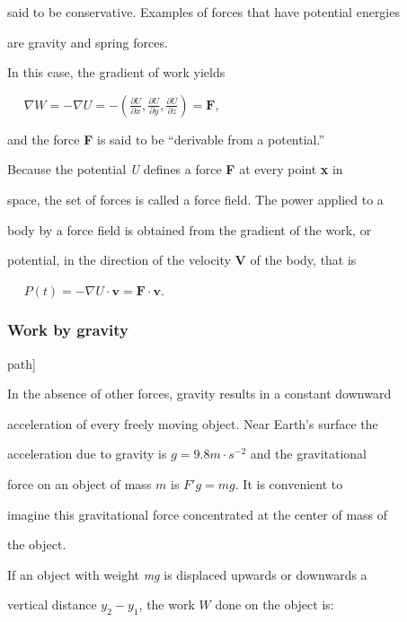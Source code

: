 said to be conservative. Examples of forces that have potential energies

are gravity and spring forces.


In this case, the gradient of work yields


$\quad$ $\nabla W =  -\nabla U= -\left(\frac{\partial U}{\partial x}, \frac{\partial U}{\partial y}, \frac{\partial U}{\partial z}\right) = \mathbf{F},$


and the force \textbf{F} is said to be ``derivable from a potential.''


Because the potential \textit{U} defines a force \textbf{F} at every point \textbf{x} in

space, the set of forces is called a force field. The power applied to a

body by a force field is obtained from the gradient of the work, or

potential, in the direction of the velocity \textbf{V} of the body, that is


$\quad$ $P(t) = -\nabla U \cdot \mathbf{v} = \mathbf{F}\cdot\mathbf{v}.$


\subsubsection{Work by gravity}
\label{sss:work-7f98}



path]


In the absence of other forces, gravity results in a constant downward

acceleration of every freely moving object. Near Earth's surface the

acceleration due to gravity is $g = 9.8 m \cdot s^{-2}$ and the gravitational

force on an object of mass $m$ is $F' g = mg$. It is convenient to

imagine this gravitational force concentrated at the center of mass of

the object.


If an object with weight \textit{mg} is displaced upwards or downwards a

vertical distance $y_2 - y_1$, the work $W$ done on the object is:


